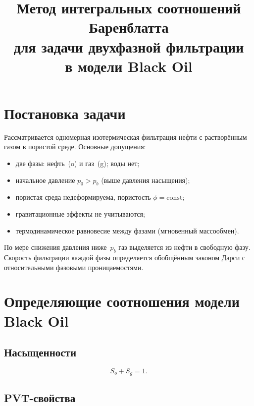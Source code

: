 \documentclass[12pt,a4paper]{article}
\title{Метод интегральных соотношений Баренблатта\\
для задачи двухфазной фильтрации\\
в модели Black Oil}
\author{}
\date{}
\begin{document}
\maketitle

\section{Постановка задачи}

Рассматривается одномерная изотермическая фильтрация нефти с растворённым газом
в пористой среде. Основные допущения:
\begin{itemize}
  \item две фазы: нефть~(o) и газ~(g); воды нет;
  \item начальное давление $p_0 > p_b$ (выше давления насыщения);
  \item пористая среда недеформируема, пористость $\phi = \mathrm{const}$;
  \item гравитационные эффекты не учитываются;
  \item термодинамическое равновесие между фазами (мгновенный массообмен).
\end{itemize}

По мере снижения давления ниже~$p_b$ газ выделяется из нефти
в свободную фазу. Скорость фильтрации каждой фазы определяется
обобщённым законом Дарси с относительными фазовыми проницаемостями.

\section{Определяющие соотношения модели Black Oil}

\subsection{Насыщенности}

\begin{equation}\label{eq:saturation}
  S_o + S_g = 1.
\end{equation}

\subsection{PVT-свойства}
\end{document}

